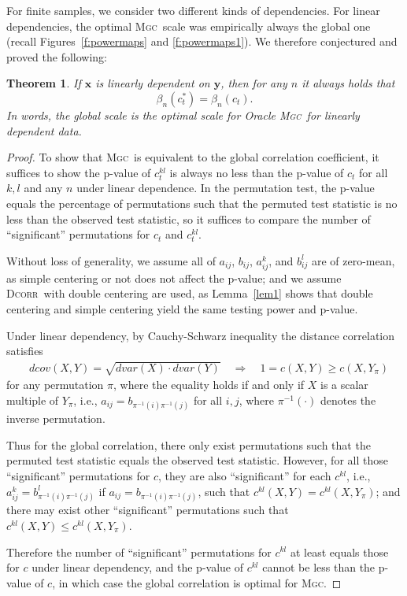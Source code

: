 \documentclass[11pt]{article}
\providecommand{\sct}[1]{{\normalfont\textsc{#1}}}
\providecommand{\mb}[1]{\boldsymbol{#1}}
\newcommand{\G}{c}
\newcommand{\Mgc}{\sct{Mgc}}
\newcommand{\Dcorr}{\sct{Dcorr}}
\newtheorem{thm}{Theorem}
\begin{document}
For finite samples, we consider two different kinds of dependencies.
For linear dependencies,  the optimal \Mgc~scale was empirically always the global one (recall Figures~\ref{f:powermaps} and \ref{f:powermaps1}). We therefore conjectured and proved the following:
\begin{thm}
\label{t:linear}
If $\mb{x}$ is linearly dependent on $\mb{y}$, then for any $n$ it always holds that
\begin{equation}
\beta_n(\G_t^*) = \beta_n(\G_t).
\end{equation}
In words, the global scale is the optimal scale for Oracle \Mgc~for linearly dependent data.
\end{thm}
\begin{proof}
To show that \Mgc~is equivalent to the global correlation coefficient, it suffices to show the p-value of $\G^{kl}_t$ is always no less than the p-value of $\G_t$ for all $k,l$ and any $n$ under linear dependence. In the permutation test, the p-value equals the percentage of permutations such that the permuted test statistic is no less than the observed test statistic, so it suffices to compare the number of ``significant'' permutations for $\G_t$ and $\G^{kl}_t$.

Without loss of generality, we assume all of $a_{ij}$, $b_{ij}$, $a_{ij}^{k}$, and $b_{ij}^{l}$ are of zero-mean, as simple centering or not does not affect the p-value; and we assume \Dcorr~with double centering are used, as Lemma~\ref{lem1} shows that double centering and simple centering yield the same testing power and p-value.

Under linear dependency, by Cauchy-Schwarz inequality the distance correlation satisfies
\begin{align*}
& dcov(X,Y) = \sqrt{dvar(X) \cdot dvar(Y)} \quad\Rightarrow\quad 1=\G(X, Y) \geq \G(X, Y_{\pi})
\end{align*}
for any permutation $\pi$, where the equality holds if and only if $X$ is a scalar multiple of $Y_{\pi}$, i.e., $a_{ij}=b_{\pi^{-1}(i) \pi^{-1}(j)}$ for all $i,j$, where $\pi^{-1}(\cdot)$ denotes the inverse permutation. 

Thus for the global correlation, there only exist permutations such that the permuted test statistic equals the observed test statistic. However, for all those ``significant'' permutations for $\G$, they are also ``significant'' for each $\G^{kl}$, i.e., $a_{ij}^{k}=b_{\pi^{-1}(i) \pi^{-1}(j)}^{l}$ if $a_{ij}=b_{\pi^{-1}(i) \pi^{-1}(j)}$, such that $\G^{kl}(X, Y)=\G^{kl}(X, Y_{\pi})$; and there may exist other ``significant'' permutations such that $\G^{kl}(X, Y) \leq \G^{kl}(X, Y_{\pi})$.

Therefore the number of ``significant'' permutations for $\G^{kl}$ at least equals those for $\G$ under linear dependency, and the p-value of $\G^{kl}$ cannot be less than the p-value of $\G$, in which case the global correlation is optimal for \Mgc. 
\end{proof}
\end{document}
